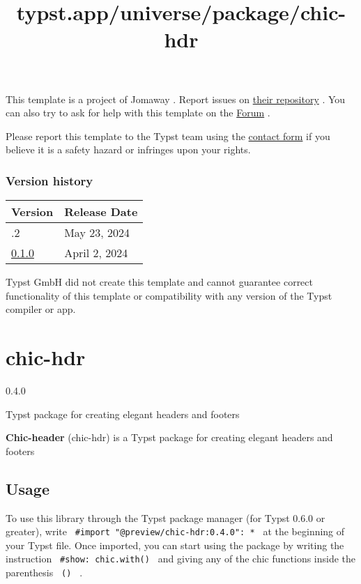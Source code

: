 This template is a project of Jomaway . Report issues on
\href{https://github.com/jomaway/typst-teacher-templates}{their
repository} . You can also try to ask for help with this template on the
\href{https://forum.typst.app}{Forum} .

Please report this template to the Typst team using the
\href{https://typst.app/contact}{contact form} if you believe it is a
safety hazard or infringes upon your rights.

\label{versions}
\subsubsection{Version history}\label{version-history}

\begin{longtable}[]{@{}ll@{}}
\toprule\noalign{}
Version & Release Date \\
\midrule\noalign{}
\endhead
\bottomrule\noalign{}
\endlastfoot
0.1.2 & May 23, 2024 \\
\href{https://typst.app/universe/package/ttt-exam/0.1.0/}{0.1.0} & April
2, 2024 \\
\end{longtable}

Typst GmbH did not create this template and cannot guarantee correct
functionality of this template or compatibility with any version of the
Typst compiler or app.


\title{typst.app/universe/package/chic-hdr}

\label{banner}
\section{chic-hdr}\label{chic-hdr}

{ 0.4.0 }

Typst package for creating elegant headers and footers

\label{readme}
\textbf{Chic-header} (chic-hdr) is a Typst package for creating elegant
headers and footers

\subsection{Usage}\label{usage}

To use this library through the Typst package manager (for Typst 0.6.0
or greater), write \texttt{\ \#import\ "@preview/chic-hdr:0.4.0":\ *\ }
at the beginning of your Typst file. Once imported, you can start using
the package by writing the instruction \texttt{\ \#show:\ chic.with()\ }
and giving any of the chic functions inside the parenthesis
\texttt{\ ()\ } .

